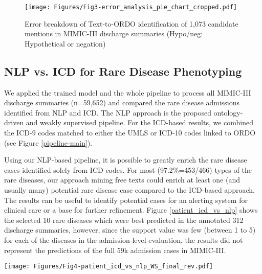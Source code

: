 \documentclass[twocolumn]{bmcart}
\begin{document}
\begin{figure}[t]
  \centering
  \texttt{[image: Figures/Fig3-error\_analysis\_pie\_chart\_cropped.pdf]}
  \caption{Error breakdown of Text-to-ORDO identification of 1,073 candidate mentions in MIMIC-III discharge summaries (Hypo/neg: Hypothetical or negation)}\label{error_pie_chart}
\end{figure}

\subsection*{NLP vs. ICD for Rare Disease Phenotyping} 
\label{subsec:nlp_vs_icd}
We applied the trained model and the whole pipeline to process all MIMIC-III discharge summaries (n=59,652) and compared the rare disease admissions identified from NLP and ICD. The NLP approach is the proposed ontology-driven and weakly supervised pipeline. For the ICD-based results, we combined the ICD-9 codes matched to either the UMLS or ICD-10 codes linked to ORDO (see Figure \ref{pipeline-main}).

Using our NLP-based pipeline, it is possible to greatly enrich the rare disease cases identified solely from ICD codes. For most (97.2\%=453/466) types of the rare diseases, our approach mining free texts could enrich at least one (and usually many) potential rare disease case compared to the ICD-based approach. The results can be useful to identify potential cases for an alerting system for clinical care or a base for further refinement. Figure \ref{patient_icd_vs_nlp} shows the selected 10 rare diseases which were best predicted in the annotated 312 discharge summaries, however, since the support value was few (between 1 to 5) for each of the diseases in the admission-level evaluation, the results did not represent the predictions of the full 59k admission cases in MIMIC-III.

\begin{figure*}[t]
  \centering
  \texttt{[image: Figures/Fig4-patient\_icd\_vs\_nlp\_WS\_final\_rev.pdf]}
  \caption{Number of rare disease patient stays from MIMIC-III (n=59,652): ICD (code-based) vs. NLP (text-based, with \textit{weak} supervision), for 10 selected diseases. Admissions are split into those \textit{only} identified through links from ICD-9 codes (in black), those \textit{only} identified from free texts with weak supervision (NLP, in white), and the intersection of cases from both ICD-9 and NLP (in grey). The percentage after each horizontal bar shows the accuracy of NLP based on the manual assessment of the identified cases.}\label{patient_icd_vs_nlp}
\end{figure*}
\end{document}
